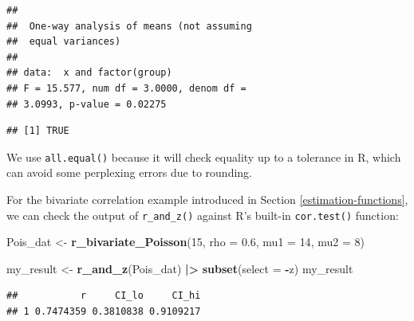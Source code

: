 \documentclass[
]{book}
\newenvironment{Shaded}{\begin{snugshade}}{\end{snugshade}}
\newcommand{\AttributeTok}[1]{\textcolor[rgb]{0.13,0.29,0.53}{#1}}
\newcommand{\DecValTok}[1]{\textcolor[rgb]{0.00,0.00,0.81}{#1}}
\newcommand{\FloatTok}[1]{\textcolor[rgb]{0.00,0.00,0.81}{#1}}
\newcommand{\FunctionTok}[1]{\textcolor[rgb]{0.13,0.29,0.53}{\textbf{#1}}}
\newcommand{\NormalTok}[1]{#1}
\newcommand{\OtherTok}[1]{\textcolor[rgb]{0.56,0.35,0.01}{#1}}
\newcommand{\SpecialCharTok}[1]{\textcolor[rgb]{0.81,0.36,0.00}{\textbf{#1}}}
\begin{document}
\begin{verbatim}
## 
##  One-way analysis of means (not assuming
##  equal variances)
## 
## data:  x and factor(group)
## F = 15.577, num df = 3.0000, denom df =
## 3.0993, p-value = 0.02275
\end{verbatim}

\begin{Shaded}
\end{Shaded}

\begin{verbatim}
## [1] TRUE
\end{verbatim}

We use \texttt{all.equal()} because it will check equality up to a tolerance in R, which can avoid some perplexing errors due to rounding.

For the bivariate correlation example introduced in Section \ref{estimation-functions}, we can check the output of \texttt{r\_and\_z()} against R's built-in \texttt{cor.test()} function:

\begin{Shaded}
\begin{Highlighting}[]
\NormalTok{Pois\_dat }\OtherTok{\textless{}{-}} \FunctionTok{r\_bivariate\_Poisson}\NormalTok{(}\DecValTok{15}\NormalTok{, }\AttributeTok{rho =} \FloatTok{0.6}\NormalTok{, }\AttributeTok{mu1 =} \DecValTok{14}\NormalTok{, }\AttributeTok{mu2 =} \DecValTok{8}\NormalTok{)}

\NormalTok{my\_result }\OtherTok{\textless{}{-}} \FunctionTok{r\_and\_z}\NormalTok{(Pois\_dat) }\SpecialCharTok{|\textgreater{}} \FunctionTok{subset}\NormalTok{(}\AttributeTok{select =} \SpecialCharTok{{-}}\NormalTok{z)}
\NormalTok{my\_result}
\end{Highlighting}
\end{Shaded}

\begin{verbatim}
##           r     CI_lo     CI_hi
## 1 0.7474359 0.3810838 0.9109217
\end{verbatim}
\end{document}
